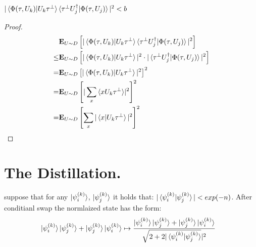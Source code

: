 \documentclass[manuscript,screen,review]{acmart}
\begin{document}
\begin{claim}
  $|\braket{\Phi(\tau,U_{k})|U_{k}\tau^{\perp}}\braket{\tau^{\perp}U^{\dagger}_{j}|\Phi(\tau,U_{j})}|^{2}
  < b$
\end{claim}
\begin{proof}

  \begin{equation*}
    \begin{split}
      &
      \exppm{|\braket{\Phi(\tau,U_{k})|U_{k}\tau^{\perp}}\braket{\tau^{\perp}U^{\dagger}_{j}|\Phi(\tau,U_{j})}|^{2}
      }{U \sim D  } \\
      \le &  \exppm{|\braket{\Phi(\tau,U_{k})|U_{k}\tau^{\perp}}|^{2}\cdot
      |\braket{\tau^{\perp}U^{\dagger}_{j}|\Phi(\tau,U_{j})}|^{2} }{U \sim D  }
      \\
      = &  \exppm{|\braket{\Phi(\tau,U_{k})|U_{k}\tau^{\perp}}|^{2} }{U \sim D
      }^{2} \\
      = & \exppm{|\sum_{x}{\braket{xU_{k}\tau^{\perp}}} |^{2}}{U \sim D  }^{2}
      \\
      = & \exppm{\sum_{x}{|\braket{x|U_{k}\tau^{\perp}}|^{2}} }{U \sim D  }^{2}
    \end{split}
  \end{equation*}
\end{proof}

\section{The Distillation.}
suppose that for any $\ket{\psi^{(k)}_{i}}$, $\ket{\psi^{(k)}_{j}}$ it holds
that: $|\braket{\psi^{(k)}_{i}|\psi^{(k)}_{j}}| < exp(-n)$. After conditianl
swap the normlaized state has the form:
\begin{equation*}
  \begin{split}
    &
    \ket{\psi^{(k)}_{i}}\ket{\psi^{(k)}_{j}}+\ket{\psi^{(k)}_{j}}\ket{\psi^{(k)}_{i}}
    \mapsto \frac{
      \ket{\psi^{(k)}_{i}}\ket{\psi^{(k)}_{j}}+\ket{\psi^{(k)}_{j}}\ket{\psi^{(k)}_{i}}
    }{ \sqrt{2 + 2 |\braket{\psi^{(k)}_{i}|\psi^{(k)}_{j}}}|^2 }
  \end{split}
\end{equation*}
\end{document}
